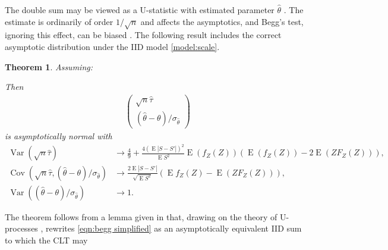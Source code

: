 \documentclass[12pt]{article}
\newtheorem{theorem}{Theorem}
\newcommand{\z}{Z}
\newcommand{\s}{S}
\newcommand{\thetahat}{\hat{\theta}}
\DeclareMathOperator{\E}{E}
\DeclareMathOperator{\var}{Var}
\DeclareMathOperator{\cov}{Cov}
\newcommand{\comment}[1]{
  \iftoggle{commenttoggle}{
    {\normalsize{\color{red}{ #1}}\normalsize}
  }
  {}
}
\begin{document}
The double sum may be viewed as a U-statistic with estimated parameter
$\hat\theta$ \citep{nolan:88}. The estimate is ordinarily of order
$1/\sqrt{n}$ and affects the asymptotics, and Begg's test,
ignoring this effect, can be biased \citep{michael:inpress-a}. The
following result includes the correct asymptotic distribution under
the IID model \eqref{model:scale}.

\begin{theorem}\label{thrm:begg asy} Assuming:
  Then
  \begin{align}
    &\begin{pmatrix} \sqrt{n}\hat\tau \\ (\thetahat-\theta)/\sigma_{\hat\theta} \end{pmatrix} 
  \end{align}
  is asymptotically normal with
  \begin{align}
    \var(\sqrt{n}\hat\tau) &\to \frac{4}{9}+\frac{4\left(\E|\s-\s'|\right)^2}{\E\s^2}\E(f_\z(\z))\left(\E(f_\z(\z))-2\E(\z F_\z(\z))\right),\\
    \cov(\sqrt{n}\hat\tau,(\thetahat-\theta)/\sigma_{\hat\theta} ) &\to           \frac{2\E|\s-\s'|}{\sqrt{\E\s^2}}\left(\E f_\z(\z)-\E(\z F_\z(\z))\right),\\
    \var((\thetahat-\theta)/\sigma_{\hat\theta} ) &\to 1.
  \end{align}
\end{theorem}
The theorem follows from a lemma given in \citet{michael:inpress-b} that, drawing on
the theory of U-processes \citep{nolan:88}, rewrites \eqref{eqn:begg simplified} as an asymptotically equivalent IID sum to which the CLT may
\end{document}
